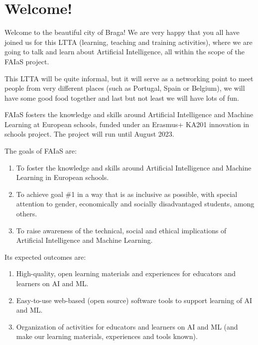 \documentclass[11pt]{article}
\title{}
\author{}
\date{}
\begin{document}
\maketitle

\clearpage
\clearpage
\section*{Welcome!}
Welcome to the beautiful city of Braga! We are very happy that you all have joined us for this LTTA (learning, teaching and training activities), where we are going to talk and learn about Artificial Intelligence, all within the scope of the FAIaS project. 

This LTTA will be quite informal, but it will serve as a networking point to meet people from very different places (such as Portugal, Spain or Belgium), we will have some good food together and last but not least we will have lots of fun. 

FAIaS fosters the knowledge and skills around Artificial Intelligence and Machine Learning at European schools, funded under an Erasmus+ KA201 innovation in schools project. The project will run until August 2023.

The goals of FAIaS are: 
\begin{enumerate}
    \item To foster the knowledge and skills around Artificial Intelligence and Machine Learning in European schools.
    \item To achieve goal \#1 in a way that is as inclusive as possible, with special attention to gender, economically and socially disadvantaged students, among others. 
    \item To raise awareness of the technical, social and ethical implications of Artificial Intelligence and Machine Learning.
\end{enumerate}

Its expected outcomes are:
\begin{enumerate}
    \item High-quality, open learning materials and experiences for educators and learners on AI and ML.
    \item Easy-to-use web-based (open source) software tools to support learning of AI and ML.
    \item Organization of activities for educators and learners on AI and ML (and make our learning materials, experiences and tools known).
\end{enumerate}
\end{document}
